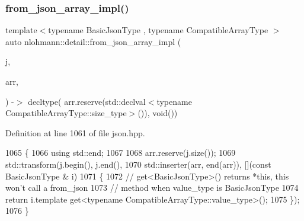 \subsubsection{\texorpdfstring{from\+\_\+json\+\_\+array\+\_\+impl()}{from\_json\_array\_impl()}\hspace{0.1cm}{\footnotesize\ttfamily [2/3]}}
{\footnotesize\ttfamily template$<$typename Basic\+Json\+Type , typename Compatible\+Array\+Type $>$ \\
auto nlohmann\+::detail\+::from\+\_\+json\+\_\+array\+\_\+impl (\begin{DoxyParamCaption}\item[{const Basic\+Json\+Type \&}]{j,  }\item[{Compatible\+Array\+Type \&}]{arr,  }\item[{\hyperlink{structnlohmann_1_1detail_1_1priority__tag}{priority\+\_\+tag}$<$ 1 $>$}]{ }\end{DoxyParamCaption}) -\/$>$ decltype(
    arr.\+reserve(std\+::declval$<$typename Compatible\+Array\+Type\+::size\+\_\+type$>$()),
    void())
}



Definition at line 1061 of file json.\+hpp.


\begin{DoxyCode}
1065 \{
1066     \textcolor{keyword}{using} std::end;
1067 
1068     arr.reserve(j.size());
1069     std::transform(j.begin(), j.end(),
1070                    std::inserter(arr, end(arr)), [](\textcolor{keyword}{const} BasicJsonType & i)
1071     \{
1072         \textcolor{comment}{// get<BasicJsonType>() returns *this, this won't call a from\_json}
1073         \textcolor{comment}{// method when value\_type is BasicJsonType}
1074         \textcolor{keywordflow}{return} i.template get<typename CompatibleArrayType::value\_type>();
1075     \});
1076 \}
\end{DoxyCode}
\mbox{\label{namespacenlohmann_1_1detail_a46b0781205d0bdc5a959343b389966a4}} 
